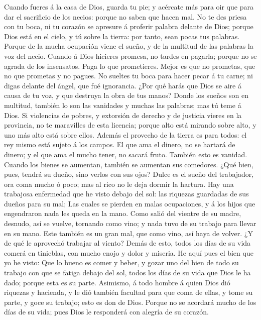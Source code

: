  Cuando fueres á la casa de Dios, guarda tu pie; y
acércate más para oir que para dar el sacrificio de los necios: porque
no saben que hacen mal.  No te des priesa con tu boca, ni
tu corazón se apresure á proferir palabra delante de Dios; porque Dios
está en el cielo, y tú sobre la tierra: por tanto, sean pocas tus
palabras.  Porque de la mucha ocupación viene el sueño, y
de la multitud de las palabras la voz del necio.  Cuando á
Dios hicieres promesa, no tardes en pagarla; porque no se agrada de los
insensatos. Paga lo que prometieres.  Mejor es que no
prometas, que no que prometas y no pagues.  No sueltes tu
boca para hacer pecar á tu carne; ni digas delante del ángel, que fué
ignorancia. ¿Por qué harás que Dios se aire á causa de tu voz, y que
destruya la obra de tus manos?  Donde los sueños son en
multitud, también lo son las vanidades y muchas las palabras; mas tú
teme á Dios.  Si violencias de pobres, y extorsión de
derecho y de justicia vieres en la provincia, no te maravilles de esta
licencia; porque alto está mirando sobre alto, y uno más alto está sobre
ellos.  Además el provecho de la tierra es para todos: el
rey mismo está sujeto á los campos.  El que ama el
dinero, no se hartará de dinero; y el que ama el mucho tener, no sacará
fruto. También esto es vanidad.  Cuando los bienes se
aumentan, también se aumentan sus comedores. ¿Qué bien, pues, tendrá su
dueño, sino verlos con sus ojos?  Dulce es el sueño del
trabajador, ora coma mucho ó poco; mas al rico no le deja dormir la
hartura.  Hay una trabajosa enfermedad que he visto
debajo del sol: las riquezas guardadas de sus dueños para su mal;
 Las cuales se pierden en malas ocupaciones, y á los
hijos que engendraron nada les queda en la mano.  Como
salió del vientre de su madre, desnudo, así se vuelve, tornando como
vino; y nada tuvo de su trabajo para llevar en su mano. 
Este también es un gran mal, que como vino, así haya de volver. ¿Y de
qué le aprovechó trabajar al viento?  Demás de esto,
todos los días de su vida comerá en tinieblas, con mucho enojo y dolor y
miseria.  He aquí pues el bien que yo he visto: Que lo
bueno es comer y beber, y gozar uno del bien de todo su trabajo con que
se fatiga debajo del sol, todos los días de su vida que Dios le ha dado;
porque esta es su parte.  Asimismo, á todo hombre á quien
Dios dió riquezas y hacienda, y le dió también facultad para que coma de
ellas, y tome su parte, y goce su trabajo; esto es don de Dios.
 Porque no se acordará mucho de los días de su vida; pues
Dios le responderá con alegría de su corazón.

